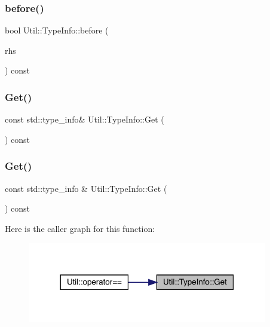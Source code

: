 \subsubsection{\texorpdfstring{before()}{before()}\hspace{0.1cm}{\footnotesize\ttfamily [3/3]}}
{\footnotesize\ttfamily bool Util\+::\+Type\+Info\+::before (\begin{DoxyParamCaption}\item[{const \mbox{\hyperlink{classUtil_1_1TypeInfo}{Type\+Info}} \&}]{rhs }\end{DoxyParamCaption}) const}

\mbox{\label{classUtil_1_1TypeInfo_af201eec5ca4934cd5d8312d6458ec605}} 
\subsubsection{\texorpdfstring{Get()}{Get()}\hspace{0.1cm}{\footnotesize\ttfamily [1/3]}}
{\footnotesize\ttfamily const std\+::type\+\_\+info\& Util\+::\+Type\+Info\+::\+Get (\begin{DoxyParamCaption}{ }\end{DoxyParamCaption}) const}

\mbox{\label{classUtil_1_1TypeInfo_ad5aa0be0eb3620266822b8c55bd43ce7}} 
\subsubsection{\texorpdfstring{Get()}{Get()}\hspace{0.1cm}{\footnotesize\ttfamily [2/3]}}
{\footnotesize\ttfamily const std\+::type\+\_\+info \& Util\+::\+Type\+Info\+::\+Get (\begin{DoxyParamCaption}{ }\end{DoxyParamCaption}) const\hspace{0.3cm}{\ttfamily [inline]}}

Here is the caller graph for this function\+:
\nopagebreak
\begin{figure}[H]
\begin{center}
\leavevmode
\includegraphics[width=297pt]{d5/d37/classUtil_1_1TypeInfo_ad5aa0be0eb3620266822b8c55bd43ce7_icgraph}
\end{center}
\end{figure}
\mbox{\label{classUtil_1_1TypeInfo_af201eec5ca4934cd5d8312d6458ec605}} 
